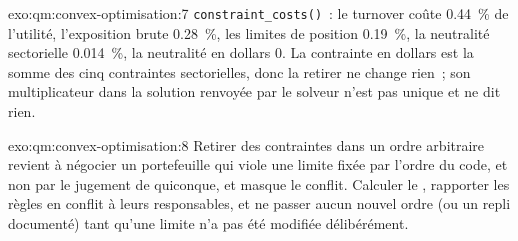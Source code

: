 \begin{solution}{exo:qm:convex-optimisation:7}
\texttt{constraint\_costs()}~: le turnover coûte 0.44~\% de l'utilité, l'exposition brute 0.28~\%, les limites de position 0.19~\%, la neutralité sectorielle 0.014~\%, la neutralité en dollars 0. La contrainte en dollars est la somme des cinq contraintes
sectorielles, donc la retirer ne change rien~; son multiplicateur dans la solution renvoyée par le solveur n'est pas unique et ne dit rien.
\end{solution}

\begin{solution}{exo:qm:convex-optimisation:8}
Retirer des contraintes dans un ordre arbitraire revient à négocier un portefeuille qui viole une limite fixée par l'ordre du code, et non par le jugement de quiconque, et masque le conflit. Calculer le , rapporter les règles en conflit à leurs responsables, et ne passer aucun nouvel ordre (ou un repli documenté) tant qu'une limite n'a pas été modifiée délibérément.
\end{solution}

